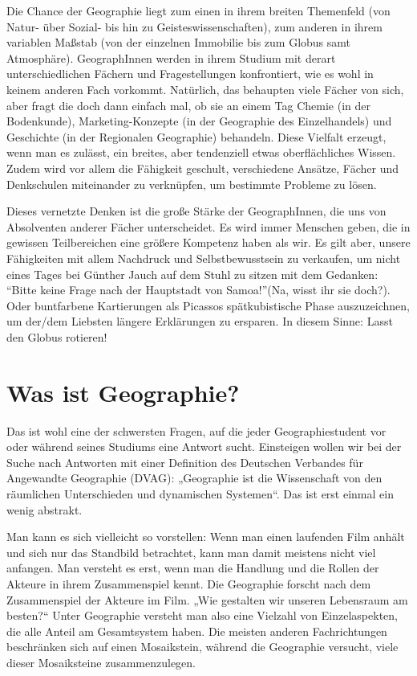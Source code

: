 Die Chance der Geographie liegt zum einen in ihrem breiten Themenfeld (von Natur- über Sozial- bis hin zu Geisteswissenschaften), zum anderen in ihrem variablen Maßstab (von der einzelnen Immobilie bis zum Globus samt Atmosphäre). GeographInnen werden in ihrem Studium mit derart unterschiedlichen Fächern und Fragestellungen konfrontiert, wie es wohl in keinem anderen Fach vorkommt. Natürlich, das behaupten viele Fächer von sich, aber fragt die doch dann einfach mal, ob sie an einem Tag Chemie (in der Bodenkunde), Marketing-Konzepte (in der Geographie des Einzelhandels) und Geschichte (in der Regionalen Geographie) behandeln. Diese Vielfalt erzeugt, wenn man es zulässt, ein breites, aber tendenziell etwas oberflächliches Wissen. Zudem wird vor allem die Fähigkeit geschult, verschiedene Ansätze, Fächer und Denkschulen miteinander zu verknüpfen, um bestimmte Probleme zu lösen.

Dieses vernetzte Denken ist die große Stärke der GeographInnen, die uns von Absolventen anderer Fächer unterscheidet. Es wird immer Menschen geben, die in gewissen Teilbereichen eine größere Kompetenz haben als wir. Es gilt aber, unsere Fähigkeiten mit allem Nachdruck und Selbstbewusstsein zu verkaufen, um nicht eines Tages bei Günther Jauch auf dem Stuhl zu sitzen mit dem Gedanken: "`Bitte keine Frage nach der Hauptstadt von Samoa!"'(Na, wisst ihr sie doch?). Oder buntfarbene Kartierungen als Picassos spätkubistische Phase auszuzeichnen, um der/dem Liebsten längere Erklärungen zu ersparen. In diesem Sinne: Lasst den Globus rotieren!

\section*{Was ist Geographie?}
Das ist wohl eine der schwersten Fragen, auf die jeder Geographiestudent vor oder während seines Studiums eine Antwort sucht. Einsteigen wollen wir bei der Suche nach Antworten mit einer Deﬁnition des Deutschen Verbandes für Angewandte Geographie (DVAG): „Geographie ist die Wissenschaft von den räumlichen Unterschieden und dynamischen Systemen“. Das ist erst einmal ein wenig abstrakt.

Man kann es sich vielleicht so vorstellen: Wenn man einen laufenden Film anhält und sich nur das Standbild betrachtet, kann man damit meistens nicht viel anfangen. Man versteht es erst, wenn man die Handlung und die Rollen der Akteure in ihrem Zusammenspiel kennt. Die Geographie forscht nach dem Zusammenspiel der Akteure im Film. „Wie gestalten wir unseren Lebensraum am besten?“ Unter Geographie versteht man also eine Vielzahl von Einzelaspekten, die alle Anteil am Gesamtsystem haben. Die meisten anderen Fachrichtungen beschränken sich auf einen Mosaikstein, während die Geographie versucht, viele dieser Mosaiksteine zusammenzulegen. 

